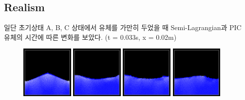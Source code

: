 \documentclass[12pt, A4]{article}
\begin{document}
\subsection{Realism}

일단 초기상태 A, B, C 상태에서 유체를 가만히 두었을 때 Semi-Lagrangian과 PIC 유체의 시간에 따른 변화를 보았다. (\Delta t = 0.033s, \Delta x = 0.02m)

\begin{figure}[h!]
  \centering
\includegraphics[width=0.23\textwidth]{semilag-state-a/img1}
\includegraphics[width=0.23\textwidth]{semilag-state-a/img2}
\includegraphics[width=0.23\textwidth]{semilag-state-a/img3}
\includegraphics[width=0.23\textwidth]{semilag-state-a/img4}


\end{figure}
\end{document}
